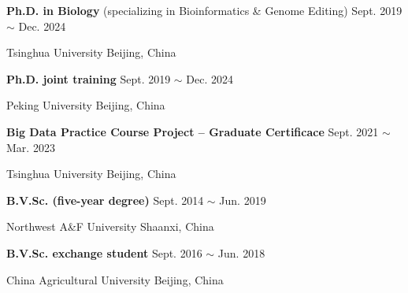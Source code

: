 

\renewcommand{\thefootnote}{\fnsymbol{footnote}}
\setcounter{footnote}{0}
    \textbf{Ph.D. in Biology} (specializing in Bioinformatics \& Genome Editing) \hfill Sept. 2019 $\sim$ Dec. 2024\footnotemark[1]

    Tsinghua University \hfill Beijing, China
    
    \textbf{Ph.D. joint training} \hfill Sept. 2019 $\sim$ Dec. 2024\footnotemark[1]
    
    Peking University \hfill Beijing, China

    \textbf{Big Data Practice Course Project -- Graduate Certificace} \hfill Sept. 2021 $\sim$ Mar. 2023
    
    Tsinghua University \hfill Beijing, China

    \textbf{B.V.Sc. (five-year degree)} \hfill Sept. 2014 $\sim$ Jun. 2019
    
    Northwest A\&F University \hfill Shaanxi, China

    \textbf{B.V.Sc. exchange student} \hfill Sept. 2016 $\sim$ Jun. 2018
    
    China Agricultural University \hfill Beijing, China

\renewcommand{\thefootnote}{\arabic{footnote}}
\setcounter{footnote}{1}

